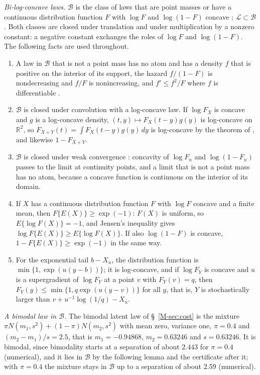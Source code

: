 \documentclass[12pt]{article}
\renewcommand{\_}{\usc\allowbreak}
\theoremstyle{definition}
\numberwithin{equation}{section}
\newcommand{\LC}{\mathcal{L}}
\newcommand{\B}{\mathcal{B}}
\begin{document}
\emph{Bi-log-concave laws.} $\B$ is the class of laws that are point masses or have a continuous distribution function $F$ with $\log F$ and $\log(1 - F)$ concave \citep*{dumbgen2017}; $\LC \subset \B$. Both classes are closed under translation and under multiplication by a nonzero constant: a negative constant exchanges the roles of $\log F$ and $\log(1 - F)$. The following facts are used throughout.
\begin{enumerate}
\item A law in $\B$ that is not a point mass has no atom and has a density $f$ that is positive on the interior of its support, the hazard $f/(1 - F)$ is nondecreasing and $f/F$ is nonincreasing, and $f' \le f^2/F$ where $f$ is differentiable \citep*{dumbgen2017}.
\item $\B$ is closed under convolution with a log-concave law. If $\log F_X$ is concave and $g$ is a log-concave density, $(t, y) \mapsto F_X(t - y)g(y)$ is log-concave on $\mathbb R^2$, so $F_{X+Y}(t) = \int F_X(t - y)g(y)\,dy$ is log-concave by the theorem of \citet{prekopa1973}, and likewise $1 - F_{X+Y}$.
\item $\B$ is closed under weak convergence \citep{saumard2019}: concavity of $\log F_n$ and $\log(1 - F_n)$ passes to the limit at continuity points, and a limit that is not a point mass has no atom, because a concave function is continuous on the interior of its domain.
\item If $X$ has a continuous distribution function $F$ with $\log F$ concave and a finite mean, then $F\{E(X)\} \ge \exp(-1)$: $F(X)$ is uniform, so $E\{\log F(X)\} = -1$, and Jensen's inequality gives $\log F\{E(X)\} \ge E\{\log F(X)\}$. If also $\log(1 - F)$ is concave, $1 - F\{E(X)\} \ge \exp(-1)$ in the same way.
\item For the exponential tail $b - X_u$, the distribution function is $\min\{1, \exp(u(y - b))\}$; it is log-concave, and if $\log F_Y$ is concave and $u$ is a supergradient of $\log F_Y$ at a point $v$ with $F_Y(v) = q$, then $F_Y(y) \le \min\{1, q\exp(u(y - v))\}$ for all $y$, that is, $Y$ is stochastically larger than $v + u^{-1}\log(1/q) - X_u$.
\end{enumerate}

\emph{A bimodal law in $\B$.} The bimodal latent law of \S~\ref{M-sec:cost} is the mixture $\pi N(m_1, s^2) + (1 - \pi)N(m_2, s^2)$ with mean zero, variance one, $\pi = 0.4$ and $(m_2 - m_1)/s = 2.5$, that is $m_1 = -0.94868$, $m_2 = 0.63246$ and $s = 0.63246$. It is bimodal, since bimodality starts at a separation of about $2.443$ for $\pi = 0.4$ (numerical), and it lies in $\B$ by the following lemma and the certificate after it; with $\pi = 0.4$ the mixture stays in $\B$ up to a separation of about $2.59$ (numerical).
\end{document}
